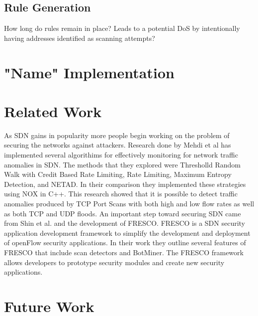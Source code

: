\documentclass[twocolumn]{article}
\begin{document}
\subsection{Rule Generation}

How long do rules remain in place? Leads to a potential DoS by intentionally having addresses identified as scanning attempts?

\section{"Name" Implementation}

\section{Related Work}

As SDN gains in popularity more people begin working on the problem of securing the networks against attackers. Research done by Mehdi et al \cite{mehdi13} has implemented several algorithims for effectively monitoring for network traffic anomalies in SDN. The methods that they explored were Thresholld Random Walk with Credit Based Rate Limiting, Rate Limiting, Maximum Entropy Detection, and NETAD. In their comparison they implemented these strategies using NOX in C++. This research showed that it is possible to detect traffic anomalies produced by TCP Port Scans with both high and low flow rates as well as both TCP and UDP floods. An important step toward securing SDN came from Shin et al. \cite{FRESCO} and the development of FRESCO. FRESCO is a SDN security application development framework to simplify the development and deployment of openFlow security applications. In their work they outline several features of FRESCO that include scan detectors and BotMiner. The FRESCO framework allows developers to prototype security modules and create new security applications. 

\section{Future Work}




\end{document}
